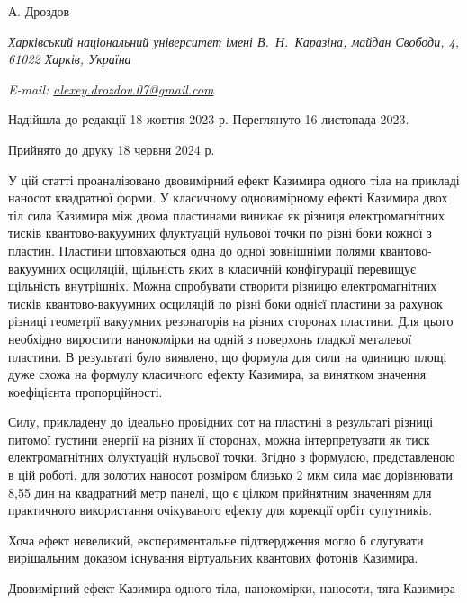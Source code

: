 \documentclass[twoside, 10pt]{article}
\makeatletter
\def\mynameukr{А. Дроздов}
\def\myemail{alexey.drozdov.07@gmail.com}
\def\myworkplaceukr{Харківський національний університет імені В.~Н.~Каразіна, майдан Свободи, 4, 61022 Харків, Україна}
\def\myorcidlink{0009-0004-1386-4534}
\def\myreceivedukr{Надійшла до редакції 18 жовтня 2023 р. Переглянуто 16 листопада 2023.}
\def\myacceptedukr{Прийнято до друку 18 червня 2024 р.}
\makeatother
\begin{document}
\centerline{\Large{\mynameukr \,\orcidlink{\myorcidlink} }}
\vspace{3mm}
\centerline{\textit{\myworkplaceukr}}
\centerline{\textit{E-mail: \href{mailto:\myemail}{\myemail}}}

\vspace{3mm}
\centerline{\myreceivedukr}
\centerline{\myacceptedukr}

\vspace{3.5mm}

У цій статті проаналізовано двовимірний ефект Казимира одного тіла
на прикладі наносот квадратної форми.
У класичному одновимірному  ефекті Казимира двох тіл сила Казимира між двома пластинами виникає як різниця електромагнітних тисків
 квантово-вакуумних флуктуацій нульової точки по різні боки кожної з пластин.
Пластини штовхаються одна до одної зовнішніми полями квантово-вакуумних осциляцій, щільність
яких в класичній конфігурації перевищує щільність внутрішніх.
Можна спробувати створити різницю електромагнітних тисків
квантово-вакуумних осциляцій по різні боки однієї пластини
за рахунок різниці геометрії вакуумних резонаторів на різних сторонах пластини.
Для цього необхідно виростити нанокомірки на одній з поверхонь гладкої металевої пластини.
В результаті було виявлено, що формула для сили на одиницю площі дуже схожа на формулу класичного ефекту Казимира,
за винятком значення коефіцієнта пропорційності.

Силу, прикладену до ідеально провідних сот на пластині в результаті
різниці питомої густини енергії на різних її сторонах, можна інтерпретувати
як тиск електромагнітних флуктуацій нульової точки.
Згідно з формулою, представленою в цій роботі, для золотих наносот
розміром близько 2 мкм сила має дорівнювати 8,55 дин на квадратний метр панелі, що є цілком
прийнятним значенням для практичного використання очікуваного ефекту для корекції орбіт супутників.

    Хоча ефект невеликий, експериментальне підтвердження
могло б слугувати вирішальним доказом існування віртуальних квантових фотонів Казимира.

\vspace{5mm}

\noindent
\begin{keywordsukr}
Двовимірний ефект Казимира одного тіла, нанокомірки, наносоти, тяга Казимира
\end{keywordsukr}

    
\end{document}
